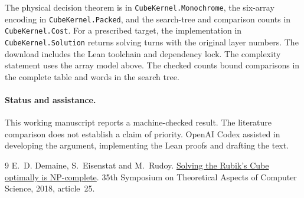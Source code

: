 \documentclass[11pt,letterpaper]{article}
\begin{document}
The physical decision theorem is in \texttt{CubeKernel.Monochrome}, the six-array encoding in
\texttt{CubeKernel.Packed}, and the search-tree and comparison counts in
\texttt{CubeKernel.Cost}. For a prescribed target, the implementation in
\texttt{CubeKernel.Solution} returns solving turns with the original layer
numbers. The download includes the Lean toolchain and dependency lock.
The complexity statement uses the array model above. The checked
counts bound comparisons in the complete table and words in the search tree.

\paragraph{Status and assistance.}
This working manuscript reports a machine-checked result. The literature
comparison does not establish a claim of priority. OpenAI Codex assisted in
developing the argument, implementing the Lean proofs and drafting the text.
\begin{thebibliography}{9}
 E.~D. Demaine, S.~Eisenstat and M.~Rudoy.
\href{https://erikdemaine.org/papers/Rubik_STACS2018/paper.pdf}{Solving the Rubik's Cube optimally is NP-complete}.
35th Symposium on Theoretical Aspects of Computer Science, 2018, article~25.
\end{thebibliography}
\end{document}
